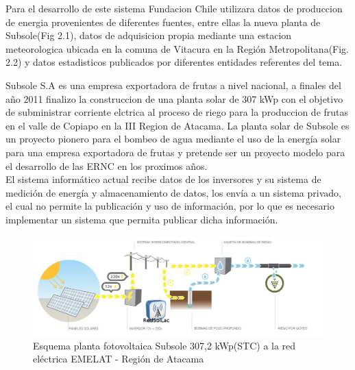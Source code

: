 Para el desarrollo de este sistema Fundacion Chile utilizara datos de produccion de energia provenientes de diferentes fuentes, entre ellas la nueva planta de Subsole(Fig 2.1), datos de adquisicion propia mediante una estacion meteorologica ubicada en la comuna de Vitacura en la Región Metropolitana(Fig. 2.2) y datos estadisticos publicados por diferentes entidades referentes del tema\cite{datosSolares:1}.

Subsole S.A\cite{subsole:1} es una empresa exportadora de frutas a nivel nacional, a finales del año 2011 finalizo la construccion de una planta solar de 307 kWp\cite{subsole:2} con el objetivo de subministrar corriente elctrica al proceso de riego para la produccion de frutas en el valle de Copiapo en la III Region de Atacama. La planta solar de Subsole es un proyecto pionero para el bombeo de agua mediante el uso de la energía solar para una empresa exportadora de frutas y pretende ser un proyecto modelo para el desarrollo de las ERNC en los proximos años.\\

El sistema informático actual recibe datos de los inversores y su sistema de medición de energía y almacenamiento de datos, los envía a un sistema privado, el cual no permite la publicación y uso de información, por lo que es necesario implementar un sistema que permita publicar dicha información.\\

\begin{figure}[h!]
        \centering
        \includegraphics[scale=0.4]{images/plantaSubSoleEsquema}
        \caption{Esquema planta fotovoltaica Subsole 307,2 kWp(STC) a la red eléctrica EMELAT - Región de Atacama}
\end{figure}

